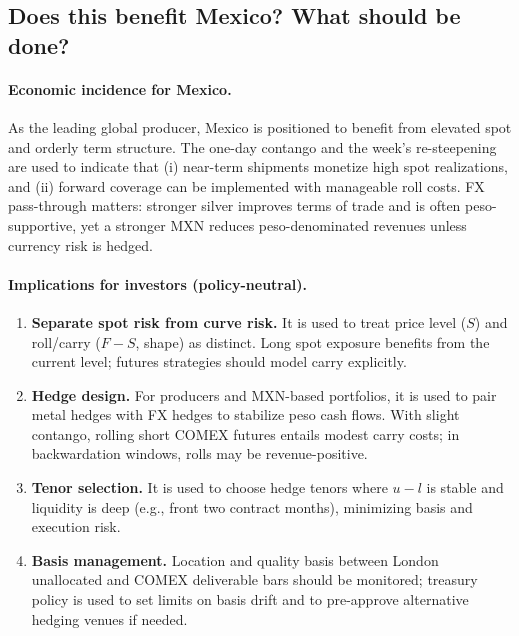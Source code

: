 \documentclass[10pt,a4paper]{article} %
\begin{document}
\subsection{Does this benefit Mexico? What should be done?}

\paragraph{Economic incidence for Mexico.}
As the leading global producer, Mexico is positioned to benefit from elevated spot and orderly term structure. The one-day contango and the week’s re-steepening are used to indicate that (i) near-term shipments monetize high spot realizations, and (ii) forward coverage can be implemented with manageable roll costs. FX pass-through matters: stronger silver improves terms of trade and is often peso-supportive, yet a stronger MXN reduces peso-denominated revenues unless currency risk is hedged.

\paragraph{Implications for investors (policy-neutral).}
\begin{enumerate}
  \item \textbf{Separate spot risk from curve risk.} It is used to treat price level (\(S\)) and roll/carry (\(F-S\), shape) as distinct. Long spot exposure benefits from the current level; futures strategies should model carry explicitly.
  \item \textbf{Hedge design.} For producers and MXN-based portfolios, it is used to pair metal hedges with FX hedges to stabilize peso cash flows. With slight contango, rolling short COMEX futures entails modest carry costs; in backwardation windows, rolls may be revenue-positive.
  \item \textbf{Tenor selection.} It is used to choose hedge tenors where \(u-l\) is stable and liquidity is deep (e.g., front two contract months), minimizing basis and execution risk.
  \item \textbf{Basis management.} Location and quality basis between London unallocated and COMEX deliverable bars should be monitored; treasury policy is used to set limits on basis drift and to pre-approve alternative hedging venues if needed.
\end{enumerate}
\end{document}
